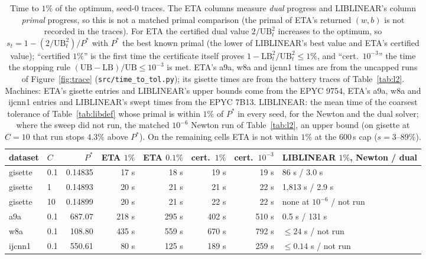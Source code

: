 \documentclass{opt2026}   %
\newcommand{\UB}{\mathrm{UB}}
\newcommand{\LB}{\mathrm{LB}}
\begin{document}
\begin{table}[h]\centering\scriptsize
\caption{Time to $1\%$ of the optimum, seed-0 traces. The ETA columns
measure \emph{dual} progress and LIBLINEAR's column \emph{primal}
progress, so this is not a matched primal comparison (the primal of
ETA's returned $(w,b)$ is not recorded in the traces). For ETA the
certified dual value $2/\UB_t^2$ increases to the optimum,
so $s_t=1-(2/\UB_t^2)/P^*$ with $P^*$ the best known primal (the lower
of LIBLINEAR's best value and ETA's certified value); ``certified
$1\%$'' is the first time the certificate itself proves
$1-\LB_t^2/\UB_t^2\le1\%$, and ``cert.\ $10^{-3}$'' the time the stopping
rule $(\UB-\LB)/\UB\le10^{-3}$ is met. ETA's a9a, w8a and ijcnn1 times are from
the uncapped runs of Figure~\ref{fig:trace} (\texttt{src/time\_to\_tol.py});
its gisette times are from the battery traces of Table~\ref{tab:l2}.
Machines: ETA's gisette entries and LIBLINEAR's upper bounds come from
the EPYC 9754, ETA's a9a, w8a and ijcnn1 entries and LIBLINEAR's swept
times from the EPYC 7B13.
LIBLINEAR: the mean time of the coarsest tolerance of Table~\ref{tab:libdef}
whose primal is within $1\%$ of $P^*$ in every seed, for the Newton and
the dual solver; where the sweep did not run, the matched $10^{-6}$
Newton run of Table~\ref{tab:l2}, an upper bound (on gisette at
$C{=}10$ that run stops $4.3\%$ above $P^*$). On the remaining cells
ETA is not within $1\%$ at the 600\,s cap ($s=3$--$89\%$).}\label{tab:t1}
\setlength{\tabcolsep}{3.5pt}
\begin{tabular}{llrrrrrl}\toprule
dataset & $C$ & $P^*$ & ETA $1\%$ & ETA $0.1\%$ & cert.\ $1\%$ & cert.\ $10^{-3}$ & LIBLINEAR $1\%$, Newton / dual \\\midrule
gisette & 0.1 & 0.14835 & 17 s & 18 s & 19 s & 19 s & 86 s / 3.0 s \\
gisette & 1 & 0.14893 & 20 s & 21 s & 21 s & 22 s & 1,813 s / 2.9 s \\
gisette & 10 & 0.14899 & 20 s & 21 s & 22 s & 22 s & none at $10^{-6}$ / not run \\
\midrule
a9a & 0.1 & 687.07 & 218 s & 295 s & 402 s & 510 s & 0.5 s / 131 s \\
w8a & 0.1 & 108.80 & 435 s & 559 s & 670 s & 792 s & $\le24$ s / not run \\
ijcnn1 & 0.1 & 550.61 & 80 s & 125 s & 189 s & 259 s & $\le0.14$ s / not run \\
\bottomrule\end{tabular}\end{table}
\end{document}
